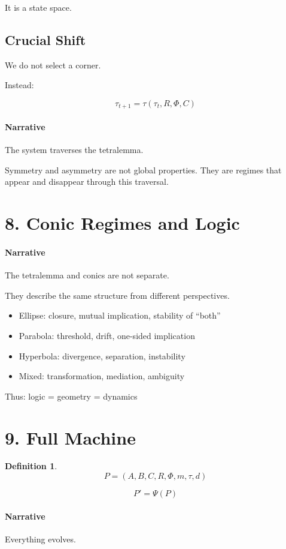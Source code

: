 \documentclass[11pt]{article}
\newtheorem{definition}{Definition}
\begin{document}
It is a state space.

\subsection*{Crucial Shift}
We do not select a corner.

Instead:

\[
\tau_{t+1} = \tau(\tau_t, R, \Phi, C)
\]

\paragraph{Narrative}
The system traverses the tetralemma.

Symmetry and asymmetry are not global properties.
They are regimes that appear and disappear through this traversal.

\section{8. Conic Regimes and Logic}

\paragraph{Narrative}
The tetralemma and conics are not separate.

They describe the same structure from different perspectives.

\begin{itemize}
\item Ellipse: closure, mutual implication, stability of ``both''
\item Parabola: threshold, drift, one-sided implication
\item Hyperbola: divergence, separation, instability
\item Mixed: transformation, mediation, ambiguity
\end{itemize}

Thus:
logic = geometry = dynamics

\section{9. Full Machine}

\begin{definition}
\[
P = (A,B,C,R,\Phi,m,\tau,d)
\]
\end{definition}

\[
P' = \Psi(P)
\]

\paragraph{Narrative}
Everything evolves.
\end{document}
